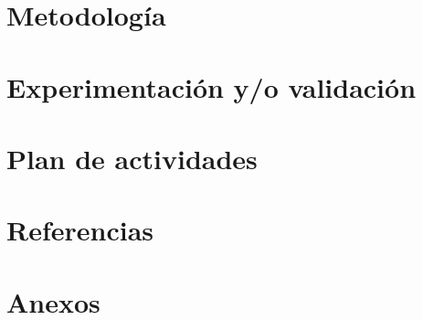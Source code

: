 \documentclass[a4paper,11pt]{article}
\begin{document}
\section{Metodología}

\newpage

\section{Experimentación y/o validación}

\newpage

\section{Plan de actividades}

\newpage

\section{Referencias}

\newpage

\section{Anexos}

\end{document}
